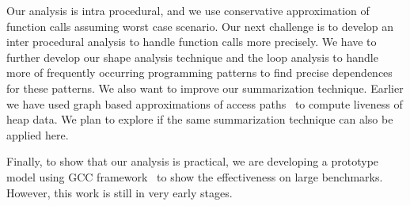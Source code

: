 \documentclass{IOS-Book-Article}
\begin{document}
Our analysis is intra procedural, and we use conservative
approximation of function calls assuming worst case scenario.
Our next challenge is to develop an inter procedural analysis
to handle function calls more precisely. We have to further
develop our shape analysis technique and the loop analysis to
handle more of frequently occurring programming patterns to find
precise dependences for these patterns.  We  also want to
improve our summarization technique. Earlier we have used
graph based approximations of access
paths~\cite{khedker07heap} to compute liveness of heap
data. We plan to explore if the same summarization technique
can also be applied here.

Finally, to show that our analysis is practical, we are
developing a prototype model using GCC
framework~\cite{gcc-web} to show the effectiveness on large
benchmarks. However, this work is still in very early stages.


\end{document}
